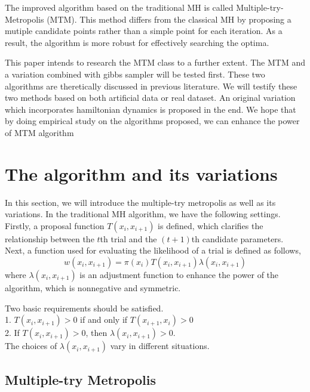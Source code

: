 \documentclass{article} %
\begin{document}
The improved algorithm based on the traditional MH is called Multiple-try-Metropolis (MTM). This method differs from the classical MH by proposing a mutiple candidate points rather than a simple point for each iteration. As a result, the algorithm is more robust for effectively searching the optima.

This paper intends to research the MTM class to a further extent. The MTM and a variation combined with gibbs sampler will be tested first. These two algorithms are theretically discussed in previous literature. We will testify these two methods based on both artificial data or real dataset. An original variation which incorporates hamiltonian dynamics is proposed in the end. We hope that by doing empirical study on the algorithms proposed, we can enhance the power of MTM algorithm 




\section{The algorithm and its variations}
In this section, we will introduce the multiple-try metropolis as well as its variations. In the traditional MH algorithm, we have the following settings. Firstly, a proposal function $T(x_i,x_{i+1})$ is defined, which clarifies the relationship between the $t$th trial and the $(t+1)$th candidate parameters. Next, a function used for evaluating the likelihood of a trial is defined as follows,
\begin{equation*}
w(x_i,x_{i+1}) = \pi(x_i) T(x_i,x_{i+1}) \lambda (x_i,x_{i+1})
\end{equation*}
where $\lambda (x_i,x_{i+1})$ is an adjustment function to enhance the power of the algorithm, which is nonnegative and symmetric.

Two basic requirements should be satisfied.\\
1. $T(x_i,x_{i+1})  > 0$ if and only if $T(x_{i+1},x_i)  > 0$\\
2. If $T(x_i,x_{i+1})  > 0$, then $\lambda (x_i,x_{i+1}) >0$.\\
The choices of $\lambda (x_i,x_{i+1})$ vary in different situations. 


\subsection{Multiple-try Metropolis}
\end{document}
